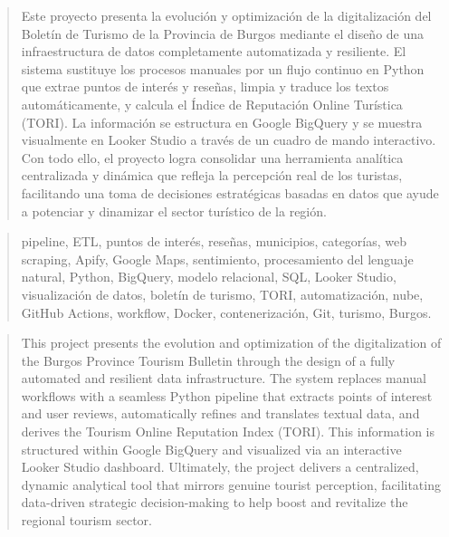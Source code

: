 \documentclass[a4paper,12pt,twoside]{memoir}
\begin{document}
\newpage\null\thispagestyle{empty}\newpage




\frontmatter

\renewcommand*\abstractname{Resumen}
\begin{abstract}

Este proyecto presenta la evolución y optimización de la digitalización del Boletín de Turismo de la Provincia de Burgos mediante el diseño de una infraestructura de datos completamente automatizada y resiliente. El sistema sustituye los procesos manuales por un flujo continuo en Python que extrae puntos de interés y reseñas, limpia y traduce los textos automáticamente, y calcula el Índice de Reputación Online Turística (TORI). La información se estructura en Google BigQuery y se muestra visualmente en Looker Studio a través de un cuadro de mando interactivo. Con todo ello, el proyecto logra consolidar una herramienta analítica centralizada y dinámica que refleja la percepción real de los turistas, facilitando una toma de decisiones estratégicas basadas en datos que ayude a potenciar y dinamizar el sector turístico de la región.

\end{abstract}

\renewcommand*\abstractname{Descriptores}
\begin{abstract}
pipeline, ETL, puntos de interés, reseñas, municipios, categorías, web scraping, Apify, Google Maps, sentimiento, procesamiento del lenguaje natural, Python, BigQuery, modelo relacional, SQL, Looker Studio, visualización de datos, boletín de turismo, TORI, automatización, nube, GitHub Actions, workflow, Docker, contenerización, Git, turismo, Burgos.
\end{abstract}

\clearpage

\renewcommand*\abstractname{Abstract}
\begin{abstract}
This project presents the evolution and optimization of the digitalization of the Burgos Province Tourism Bulletin through the design of a fully automated and resilient data infrastructure. The system replaces manual workflows with a seamless Python pipeline that extracts points of interest and user reviews, automatically refines and translates textual data, and derives the Tourism Online Reputation Index (TORI). This information is structured within Google BigQuery and visualized via an interactive Looker Studio dashboard. Ultimately, the project delivers a centralized, dynamic analytical tool that mirrors genuine tourist perception, facilitating data-driven strategic decision-making to help boost and revitalize the regional tourism sector.
\end{abstract}
\end{document}
